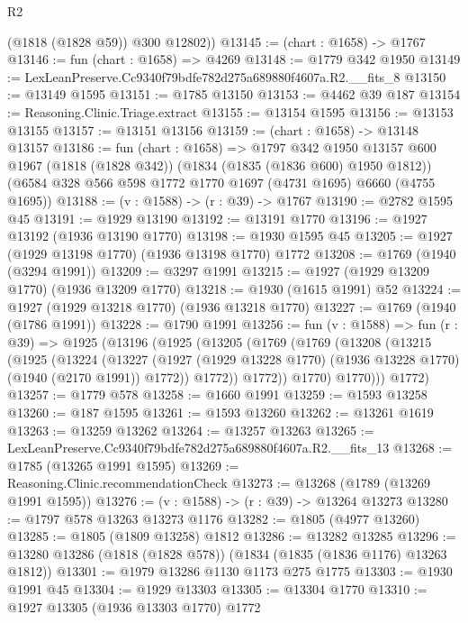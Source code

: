 \begin{lexlean}{R2}
\begin{coremodule}
        (@1818 (@1828 @59))
        @300
        @12802))
@13145 := (chart : @1658) -> @1767
@13146 := fun (chart : @1658) => @4269
@13148 := @1779 @342 @1950
@13149 := LexLeanPreserve.Cc9340f79bdfe782d275a689880f4607a.R2.__fits_8
@13150 := @13149 @1595
@13151 := @1785 @13150
@13153 := @4462 @39 @187
@13154 := Reasoning.Clinic.Triage.extract
@13155 := @13154 @1595
@13156 := @13153 @13155
@13157 := @13151 @13156
@13159 := (chart : @1658) -> @13148 @13157
@13186 := fun (chart : @1658) =>
  @1797
    @342
    @1950
    @13157
    @600
    @1967
    (@1818 (@1828 @342))
    (@1834 (@1835 (@1836 @600) @1950 @1812))
    (@6584 @328 @566 @598 @1772 @1770 @1697 (@4731 @1695) @6660 (@4755 @1695))
@13188 := (v : @1588) -> (r : @39) -> @1767
@13190 := @2782 @1595 @45
@13191 := @1929 @13190
@13192 := @13191 @1770
@13196 := @1927 @13192 (@1936 @13190 @1770)
@13198 := @1930 @1595 @45
@13205 := @1927 (@1929 @13198 @1770) (@1936 @13198 @1770) @1772
@13208 := @1769 (@1940 (@3294 @1991))
@13209 := @3297 @1991
@13215 := @1927 (@1929 @13209 @1770) (@1936 @13209 @1770)
@13218 := @1930 (@1615 @1991) @52
@13224 := @1927 (@1929 @13218 @1770) (@1936 @13218 @1770)
@13227 := @1769 (@1940 (@1786 @1991))
@13228 := @1790 @1991
@13256 := fun (v : @1588) =>
  fun (r : @39) =>
  @1925
    (@13196
      (@1925
        (@13205
          (@1769
            (@1769
              (@13208
                (@13215
                  (@1925
                    (@13224
                      (@13227
                        (@1927
                          (@1929 @13228 @1770)
                          (@1936 @13228 @1770)
                          (@1940 (@2170 @1991))
                          @1772))
                      @1772))
                  @1772))
              @1770)
            @1770)))
      @1772)
@13257 := @1779 @578
@13258 := @1660 @1991
@13259 := @1593 @13258
@13260 := @187 @1595
@13261 := @1593 @13260
@13262 := @13261 @1619
@13263 := @13259 @13262
@13264 := @13257 @13263
@13265 := LexLeanPreserve.Cc9340f79bdfe782d275a689880f4607a.R2.__fits_13
@13268 := @1785 (@13265 @1991 @1595)
@13269 := Reasoning.Clinic.recommendationCheck
@13273 := @13268 (@1789 (@13269 @1991 @1595))
@13276 := (v : @1588) -> (r : @39) -> @13264 @13273
@13280 := @1797 @578 @13263 @13273 @1176
@13282 := @1805 (@4977 @13260)
@13285 := @1805 (@1809 @13258) @1812
@13286 := @13282 @13285
@13296 := @13280 @13286 (@1818 (@1828 @578)) (@1834 (@1835 (@1836 @1176) @13263 @1812))
@13301 := @1979 @13286 @1130 @1173 @275 @1775
@13303 := @1930 @1991 @45
@13304 := @1929 @13303
@13305 := @13304 @1770
@13310 := @1927 @13305 (@1936 @13303 @1770) @1772

\end{coremodule}
\end{lexlean}
